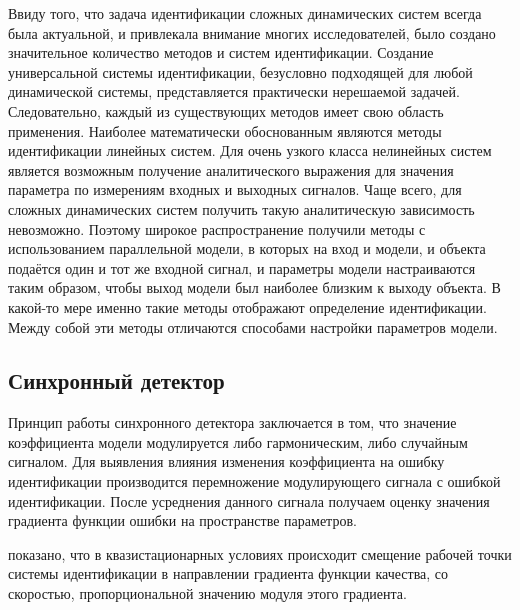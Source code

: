 Ввиду того, что задача идентификации сложных динамических систем всегда была актуальной,
и привлекала внимание многих исследователей, было создано
значительное количество методов и систем идентификации.
Создание универсальной системы идентификации, безусловно подходящей для
любой динамической системы, представляется практически нерешаемой задачей.
Следовательно, каждый из существующих методов имеет свою область применения.
Наиболее математически обоснованным являются методы идентификации
линейных систем.
Для очень узкого класса нелинейных систем является возможным
получение аналитического выражения для значения параметра
по измерениям входных и выходных сигналов. Чаще всего,
для сложных динамических систем получить такую аналитическую
зависимость невозможно. Поэтому широкое распространение получили методы
с использованием параллельной модели, %
в которых на вход и модели, и объекта подаётся один и тот же входной сигнал,
и параметры модели настраиваются таким образом, чтобы выход модели
был наиболее близким к выходу объекта. В какой-то мере
именно такие методы отображают определение идентификации.
Между собой эти методы отличаются способами настройки параметров модели.


\subsection{Синхронный детектор} %

Принцип работы синхронного детектора %
заключается в том,
что значение коэффициента модели модулируется либо гармоническим,
либо случайным сигналом. Для выявления влияния
изменения коэффициента на ошибку идентификации
производится перемножение модулирующего сигнала с ошибкой
идентификации. После усреднения данного сигнала
получаем оценку значения градиента функции ошибки на
пространстве параметров.


показано, что в квазистационарных условиях
происходит смещение рабочей точки системы идентификации
в направлении градиента функции качества,
со скоростью, пропорциональной значению модуля этого градиента.

